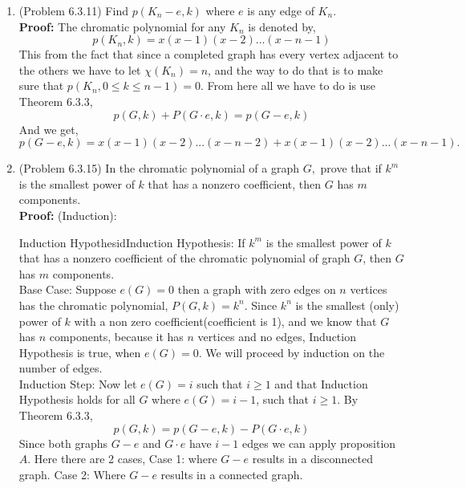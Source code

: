 \documentclass{amsart}
\begin{document}
\begin{enumerate}
\vspace{1in}


\item (Problem 6.3.11) Find $p(K_n-e,k)$ where $e$ is any edge of $K_n.$\\

\textbf{Proof:} The chromatic polynomial for any $K_n$ is denoted by,
\begin{equation*}
p(K_n, k) = x(x-1)(x-2)...(x-n-1)
\end{equation*}
This from the fact that since a completed graph has every vertex adjacent to the others we have to let $\chi(K_n) = n$, and the way to do that is to make sure that $p(K_n, 0\leq k \leq n-1) = 0$. From here all we have to do is use Theorem 6.3.3,
\begin{equation*}
p(G,k) + P(G\cdot e, k) = p(G-e,k)
\end{equation*}
And we get,
\begin{equation*}
 p(G-e,k) = x(x-1)(x-2)...(x-n-2) + x(x-1)(x-2)...(x-n-1).
\end{equation*}



\vspace{1in}

\item (Problem 6.3.15) In the chromatic polynomial of a graph $G,$ prove that if $k^m$ is the smallest power of $k$ that has a nonzero coefficient, then $G$ has $m$ components. \\

\textbf{Proof:} (Induction):

Induction HypothesidInduction Hypothesis: If $k^m$ is the smallest power of $k$ that has a nonzero coefficient of the chromatic polynomial of graph $G$, then $G$ has $m$ components.\\

Base Case: Suppose $e(G) = 0$ then a graph with zero edges on $n$ vertices has the chromatic polynomial, $P(G,k) = k^n$. Since $k^n$ is the smallest (only) power of $k$ with a non zero coefficient(coefficient is 1), and we know that $G$ has $n$ components, because it has $n$ vertices and no edges, Induction Hypothesis is true, when $e(G) = 0$. We will proceed by induction on the number of edges.\\

Induction Step: Now let $e(G) = i$ such that $i \geq 1$ and that Induction Hypothesis holds for all $G$ where $e(G) = i-1$, such that $i \geq 1$. By Theorem 6.3.3, \begin{equation*}
p(G,k) = p(G-e,k) - P(G\cdot e, k)
\end{equation*}
Since both graphs $G-e$ and $G\cdot e$ have $i-1$ edges we can apply proposition $A$. Here there are 2 cases, Case 1: where $G-e$ results in a disconnected graph. Case 2: Where $G-e$ results in a connected graph.\\


\end{enumerate}
\end{document}

